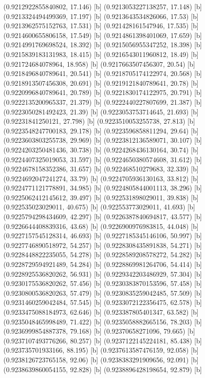 {{{(0.9212922855840802, 17.146) [b] 
(0.9213053227138257, 17.148) [b] 
(0.9213324494499369, 17.197) [b] 
(0.9213643534826066, 17.53) [b] 
(0.9213962575152763, 17.531) [b] 
(0.921428161547946, 17.535) [b] 
(0.9214600655806158, 17.549) [b] 
(0.9214861398401069, 17.659) [b] 
(0.9214991769698524, 18.392) [b] 
(0.9215056955347252, 18.398) [b] 
(0.9215839183131983, 18.415) [b] 
(0.9216543011960812, 18.49) [b] 
(0.921724684078964, 18.958) [b] 
(0.9217663507456307, 20.54) [b] 
(0.9218496840789641, 20.541) [b] 
(0.9218705174122974, 20.568) [b] 
(0.9218913507456308, 20.691) [b] 
(0.9219121840789641, 20.78) [b] 
(0.9220996840789641, 20.789) [b] 
(0.9221830174122975, 20.791) [b] 
(0.9222135200965337, 21.379) [b] 
(0.9222440227807699, 21.387) [b] 
(0.9223050281492423, 21.39) [b] 
(0.9223053753714645, 21.693) [b] 
(0.92231841250121, 27.798) [b] 
(0.9223510053255738, 27.813) [b] 
(0.9223548247700183, 29.178) [b] 
(0.9223596858811294, 29.64) [b] 
(0.9223603803255738, 29.969) [b] 
(0.9223812136589071, 30.107) [b] 
(0.9224203250481436, 30.738) [b] 
(0.9224268436130164, 30.74) [b] 
(0.9224407325019053, 31.597) [b] 
(0.9224650380574608, 31.612) [b] 
(0.9224678158352386, 31.657) [b] 
(0.922468510279683, 32.339) [b] 
(0.9224692047241274, 33.79) [b] 
(0.9224705936130163, 33.812) [b] 
(0.9224771121778891, 34.985) [b] 
(0.9224805844001113, 38.296) [b] 
(0.9225062412145612, 39.497) [b] 
(0.922531898029011, 39.838) [b] 
(0.922535023029011, 40.675) [b] 
(0.922553773029011, 41.693) [b] 
(0.9225794298434609, 42.297) [b] 
(0.9226387840694817, 43.577) [b] 
(0.9226644408839316, 43.68) [b] 
(0.9226900976983815, 44.048) [b] 
(0.9227157545128314, 46.693) [b] 
(0.9227185345146106, 50.997) [b] 
(0.9227746890518972, 54.257) [b] 
(0.9228308435891838, 54.271) [b] 
(0.9228448822235055, 54.278) [b] 
(0.9228589208578272, 54.282) [b] 
(0.9228729594921489, 54.284) [b] 
(0.9228869981264706, 54.414) [b] 
(0.9228925536820262, 56.931) [b] 
(0.9229342203486929, 57.304) [b] 
(0.9230175536820262, 57.456) [b] 
(0.9230383870153596, 57.458) [b] 
(0.9230800536820263, 57.479) [b] 
(0.9230835259042485, 57.509) [b] 
(0.9231460259042484, 57.545) [b] 
(0.9233072122356475, 62.578) [b] 
(0.9233475088184973, 62.646) [b] 
(0.923387805401347, 63.582) [b] 
(0.9235048465998489, 71.422) [b] 
(0.9235058882665156, 78.203) [b] 
(0.9236999854887378, 79.168) [b] 
(0.92370658271096, 79.665) [b] 
(0.9237107493776266, 80.257) [b] 
(0.9237122145224181, 85.438) [b] 
(0.923735701933166, 88.195) [b] 
(0.9237613587476159, 92.058) [b] 
(0.9238126723765158, 92.06) [b] 
(0.9238383291909656, 92.091) [b] 
(0.9238639860054155, 92.828) [b] 
(0.9238896428198654, 92.879) [b] 
}}}
